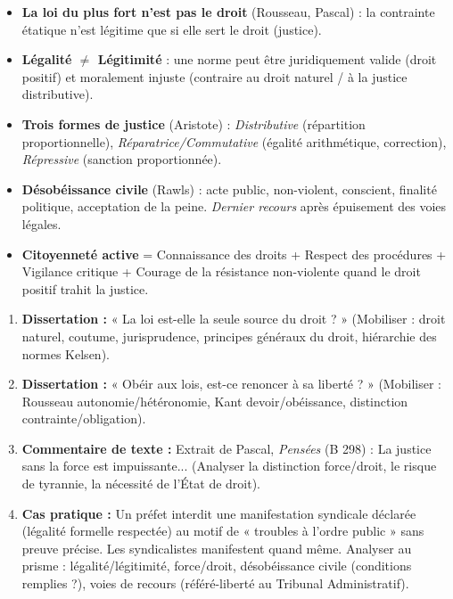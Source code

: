 \documentclass[11pt]{article}
\begin{document}
\begin{aretenir}
\begin{itemize}
    \item \textbf{La loi du plus fort n'est pas le droit} (Rousseau, Pascal) : la contrainte étatique n'est légitime que si elle sert le droit (justice).
    \item \textbf{Légalité $\neq$ Légitimité} : une norme peut être juridiquement valide (droit positif) et moralement injuste (contraire au droit naturel / à la justice distributive).
    \item \textbf{Trois formes de justice} (Aristote) : \emph{Distributive} (répartition proportionnelle), \emph{Réparatrice/Commutative} (égalité arithmétique, correction), \emph{Répressive} (sanction proportionnée).
    \item \textbf{Désobéissance civile} (Rawls) : acte public, non-violent, conscient, finalité politique, acceptation de la peine. \emph{Dernier recours} après épuisement des voies légales.
    \item \textbf{Citoyenneté active} = Connaissance des droits + Respect des procédures + Vigilance critique + Courage de la résistance non-violente quand le droit positif trahit la justice.
\end{itemize}
\end{aretenir}

\begin{exercice}
\begin{enumerate}
    \item \textbf{Dissertation :} « La loi est-elle la seule source du droit ? » (Mobiliser : droit naturel, coutume, jurisprudence, principes généraux du droit, hiérarchie des normes Kelsen).
    \item \textbf{Dissertation :} « Obéir aux lois, est-ce renoncer à sa liberté ? » (Mobiliser : Rousseau autonomie/hétéronomie, Kant devoir/obéissance, distinction contrainte/obligation).
    \item \textbf{Commentaire de texte :} Extrait de Pascal, \emph{Pensées} (B 298) : \guillemotleft La justice sans la force est impuissante... \guillemotright (Analyser la distinction force/droit, le risque de tyrannie, la nécessité de l'État de droit).
    \item \textbf{Cas pratique :} Un préfet interdit une manifestation syndicale déclarée (légalité formelle respectée) au motif de « troubles à l'ordre public » sans preuve précise. Les syndicalistes manifestent quand même. Analyser au prisme : légalité/légitimité, force/droit, désobéissance civile (conditions remplies ?), voies de recours (référé-liberté au Tribunal Administratif).
\end{enumerate}
\end{exercice}
\end{document}
